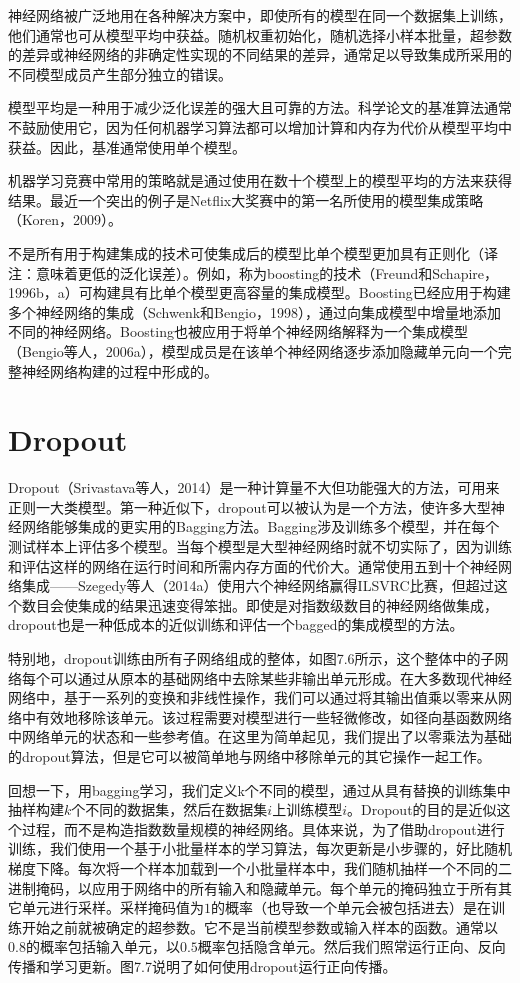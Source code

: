 神经网络被广泛地用在各种解决方案中，即使所有的模型在同一个数据集上训练，他们通常也可从模型平均中获益。随机权重初始化，随机选择小样本批量，超参数的差异或神经网络的非确定性实现的不同结果的差异，通常足以导致集成所采用的不同模型成员产生部分独立的错误。

模型平均是一种用于减少泛化误差的强大且可靠的方法。科学论文的基准算法通常不鼓励使用它，因为任何机器学习算法都可以增加计算和内存为代价从模型平均中获益。因此，基准通常使用单个模型。

机器学习竞赛中常用的策略就是通过使用在数十个模型上的模型平均的方法来获得结果。最近一个突出的例子是Netflix大奖赛中的第一名所使用的模型集成策略（Koren，2009）。

不是所有用于构建集成的技术可使集成后的模型比单个模型更加具有正则化（译注：意味着更低的泛化误差）。例如，称为boosting的技术（Freund和Schapire，1996b，a）可构建具有比单个模型更高容量的集成模型。Boosting已经应用于构建多个神经网络的集成（Schwenk和Bengio，1998），通过向集成模型中增量地添加不同的神经网络。Boosting也被应用于将单个神经网络解释为一个集成模型（Bengio等人，2006a），模型成员是在该单个神经网络逐步添加隐藏单元向一个完整神经网络构建的过程中形成的。

\section{Dropout}

Dropout（Srivastava等人，2014）是一种计算量不大但功能强大的方法，可用来正则一大类模型。第一种近似下，dropout可以被认为是一个方法，使许多大型神经网络能够集成的更实用的Bagging方法。Bagging涉及训练多个模型，并在每个测试样本上评估多个模型。当每个模型是大型神经网络时就不切实际了，因为训练和评估这样的网络在运行时间和所需内存方面的代价大。通常使用五到十个神经网络集成——Szegedy等人（2014a）使用六个神经网络赢得ILSVRC比赛，但超过这个数目会使集成的结果迅速变得笨拙。即使是对指数级数目的神经网络做集成，dropout也是一种低成本的近似训练和评估一个bagged的集成模型的方法。

特别地，dropout训练由所有子网络组成的整体，如图7.6所示，这个整体中的子网络每个可以通过从原本的基础网络中去除某些非输出单元形成。在大多数现代神经网络中，基于一系列的变换和非线性操作，我们可以通过将其输出值乘以零来从网络中有效地移除该单元。该过程需要对模型进行一些轻微修改，如径向基函数网络中网络单元的状态和一些参考值。在这里为简单起见，我们提出了以零乘法为基础的dropout算法，但是它可以被简单地与网络中移除单元的其它操作一起工作。

回想一下，用bagging学习，我们定义k个不同的模型，通过从具有替换的训练集中抽样构建$k$个不同的数据集，然后在数据集$i$上训练模型$i$。Dropout的目的是近似这个过程，而不是构造指数数量规模的神经网络。具体来说，为了借助dropout进行训练，我们使用一个基于小批量样本的学习算法，每次更新是小步骤的，好比随机梯度下降。每次将一个样本加载到一个小批量样本中，我们随机抽样一个不同的二进制掩码，以应用于网络中的所有输入和隐藏单元。每个单元的掩码独立于所有其它单元进行采样。采样掩码值为$1$的概率（也导致一个单元会被包括进去）是在训练开始之前就被确定的超参数。它不是当前模型参数或输入样本的函数。通常以$0.8$的概率包括输入单元，以$0.5$概率包括隐含单元。然后我们照常运行正向、反向传播和学习更新。图7.7说明了如何使用dropout运行正向传播。

